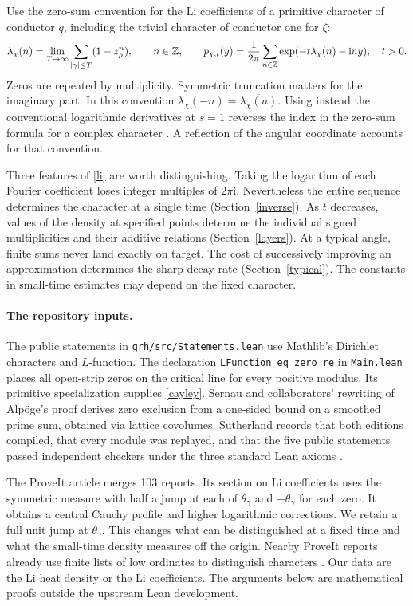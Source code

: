 \documentclass[11pt,letterpaper]{article}
\newcommand{\I}{\mathrm i}\newcommand{\e}{\mathrm e}
\theoremstyle{plain}
\theoremstyle{definition}\newtheorem{example}[theorem]{Example}
\begin{document}
Use the zero-sum convention for the Li coefficients of a primitive character of conductor $q$, including the trivial character of conductor one for $\zeta$:
\begin{equation}\label{li}
 \lambda_\chi(n)=\lim_{T\to\infty}\sum_{|\gamma|\le T}
                (1-z_\rho^n),\qquad n\in\Z,\qquad
 p_{\chi,t}(y)=\frac1{2\pi}\sum_{n\in\Z}
                  \exp(-t\lambda_\chi(n)-\I n y),\quad t>0.
\end{equation}
Zeros are repeated by multiplicity. Symmetric truncation matters for the imaginary part. In this convention $\lambda_\chi(-n)=\overline{\lambda_\chi(n)}$. Using instead the conventional logarithmic derivatives at $s=1$ reverses the index in the zero-sum formula for a complex character \cite{lagarias}. A reflection of the angular coordinate accounts for that convention.

Three features of \eqref{li} are worth distinguishing. Taking the logarithm of each Fourier coefficient loses integer multiples of $2\pi\I$. Nevertheless the entire sequence determines the character at a single time (Section~\ref{inverse}). As $t$ decreases, values of the density at specified points determine the individual signed multiplicities and their additive relations (Section~\ref{layers}). At a typical angle, finite sums never land exactly on target. The cost of successively improving an approximation determines the sharp decay rate (Section~\ref{typical}). The constants in small-time estimates may depend on the fixed character.

\paragraph{The repository inputs.}
The public statements in \texttt{grh/src/Statements.lean} use Mathlib's Dirichlet characters and $L$-function. The declaration \texttt{LFunction\_eq\_zero\_re} in \texttt{Main.lean} places all open-strip zeros on the critical line for every positive modulus. Its primitive specialization supplies \eqref{cayley}. Sernau and collaborators' rewriting of Alp\"oge's proof derives zero exclusion from a one-sided bound on a smoothed prime sum, obtained via lattice covolumes. Sutherland records that both editions compiled, that every module was replayed, and that the five public statements passed independent checkers under the three standard Lean axioms \cite{lean,mit}.

The ProveIt article \cite{article} merges 103 reports. Its section on Li coefficients uses the symmetric measure with half a jump at each of $\theta_\gamma$ and $-\theta_\gamma$ for each zero. It obtains a central Cauchy profile and higher logarithmic corrections. We retain a full unit jump at $\theta_\gamma$. This changes what can be distinguished at a fixed time and what the small-time density measures off the origin. Nearby ProveIt reports already use finite lists of low ordinates to distinguish characters \cite{lowzeros}. Our data are the Li heat density or the Li coefficients. The arguments below are mathematical proofs outside the upstream Lean development.
\end{document}
